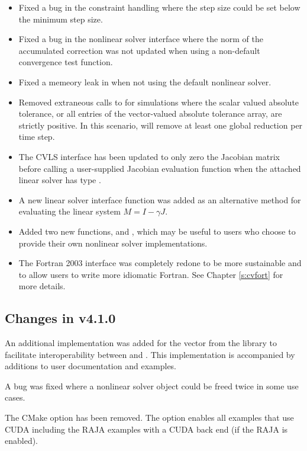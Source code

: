 \begin{itemize}
\item Fixed a bug in the {\cvode} constraint handling where the step size could be
set below the minimum step size.
%
\item Fixed a bug in the {\cvode} nonlinear solver interface where the norm of the
accumulated correction was not updated when using a non-default convergence
test function.
%
\item Fixed a memeory leak in {\fcvode} when not using the default nonlinear solver.
%
\item Removed extraneous calls to  for simulations where the scalar valued
absolute tolerance, or all entries of the vector-valued absolute tolerance
array, are strictly positive.  In this scenario, {\cvode} will remove at least
one global reduction per time step.
%
\item The CVLS interface has been updated to only zero the Jacobian matrix before
calling a user-supplied Jacobian evaluation function when the attached linear
solver has type \newline\noindent
{}.
%
\item A new linear solver interface function  was added as an
alternative method for evaluating the linear system $M = I - \gamma J$.
%
\item Added two new functions,  and
, which may be useful to users who choose to provide
their own nonlinear solver implementations.
%
\item The {\cvode} Fortran 2003 interface was completely redone to be more sustainable
and to allow users to write more idiomatic Fortran. See Chapter \ref{s:cvfort}
for more details.
\end{itemize}


\subsection*{Changes in v4.1.0}

An additional {\nvector} implementation was added for the
{\tpetra} vector from the {\trilinos} library to facilitate interoperability
between {\sundials} and {\trilinos}. This implementation is accompanied by
additions to user documentation and {\sundials} examples.

A bug was fixed where a nonlinear solver object could be freed twice in some use
cases.

The  CMake option has been removed. The option 
enables all examples that use CUDA including the RAJA examples with a CUDA back end (if the RAJA
{\nvector} is enabled).

